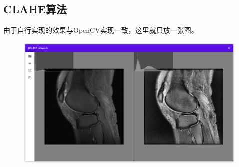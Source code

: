 \documentclass{article}
\begin{document}
\subsection{CLAHE算法}

由于自行实现的效果与OpenCV实现一致，这里就只放一张图。

\begin{figure}[H]
    \includegraphics[width=\textwidth]{img/clahe.png}
\end{figure}
\end{document}
